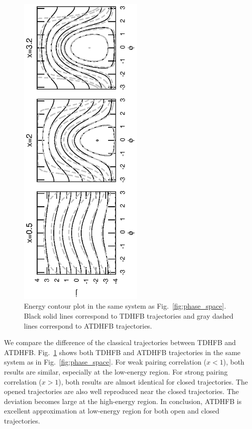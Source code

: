 \documentclass[11pt]{book} %
\begin{document}
\begin{figure}[tb]
 \begin{center}
  \includegraphics[width=60mm,angle=-90]{images/phase_compare.eps}
 \end{center}
 \caption{Energy contour plot in the same system as Fig.~\ref{fig:phase_space}. Black solid lines correspond to TDHFB trajectories and gray dashed lines correspond to ATDHFB trajectories. 
	}
 \label{fig:phase_compare}
\end{figure}

We compare the difference of the classical trajectories between TDHFB and ATDHFB. Fig.~\ref{fig:phase_compare} shows both TDHFB and ATDHFB trajectories in the same system as in Fig.~\ref{fig:phase_space}. For weak pairing correlation ($x<1$), both results are similar, especially at the low-energy region. For strong pairing correlation ($x>1$), both results are almost identical for closed trajectories. The opened trajectories are also well reproduced near the closed trajectories. The deviation becomes large at the high-energy region. In conclusion, ATDHFB is excellent approximation at low-energy region for both open and closed trajectories.
\end{document}

